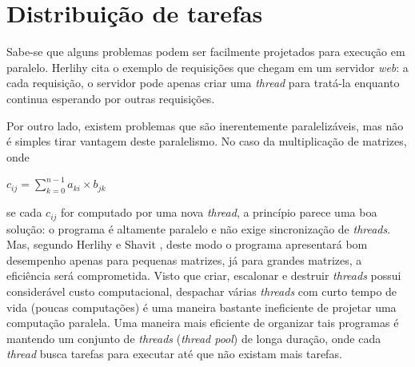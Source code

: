 \documentclass[ccc, pg2]{esinucpel}
\begin{document}
\section{Distribuição de tarefas} \label{sec:workdistrib}
Sabe-se que alguns problemas podem ser facilmente projetados para execução em paralelo. %
Herlihy \cite{bib:herlihy:theart} cita o exemplo de requisições que chegam em um servidor \textit{web}: a cada requisição, o servidor pode apenas criar uma \textit{thread} para tratá-la enquanto continua esperando por outras requisições.

Por outro lado, existem problemas que são inerentemente paralelizáveis, mas não é simples tirar vantagem deste paralelismo. No caso da multiplicação de matrizes, onde
\begin{center} $c_{ij}=\sum\limits_{k=0}^{n-1}a_{ki}×b_{jk}$ \end{center}
se cada $c_{ij}$ for computado por uma nova \textit{thread}, a princípio parece uma boa solução: o programa é altamente paralelo e não exige sincronização de {\it threads}. Mas, segundo Herlihy e Shavit \cite{bib:herlihy:theart}, deste modo o programa apresentará bom desempenho apenas para pequenas matrizes, já para grandes matrizes, a eficiência será comprometida. Visto que criar, escalonar e destruir \textit{threads} possui considerável custo computacional, despachar várias \textit{threads} com curto tempo de vida (poucas computações) é uma maneira bastante ineficiente de projetar uma computação paralela. Uma maneira mais eficiente de organizar tais programas é mantendo um conjunto de {\it threads} ({\it thread pool}) de longa duração, onde cada {\it thread} busca tarefas para executar até que não existam mais tarefas. 



\end{document}
